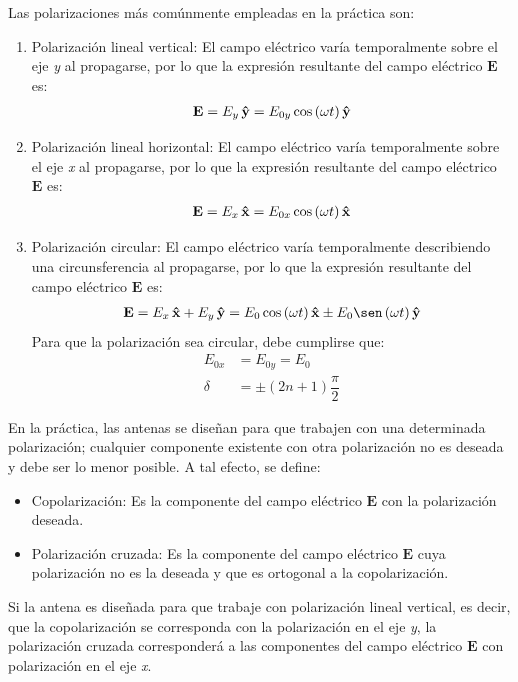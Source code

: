 Las polarizaciones más comúnmente empleadas en la práctica son:
\begin{enumerate}
\item Polarización lineal vertical: El campo eléctrico varía temporalmente sobre el eje \emph{y} al propagarse, por lo que la expresión resultante del campo eléctrico $\mathbf{E}$ es:
\begin{align}
\mathbf{E} = E_y\,\bm{\mathbf{\hat{y}}} =  E_{0y}\cos\left(\omega t\right)\bm{\mathbf{\hat{y}}}
\label{ec_intro:72}
\end{align}
\item Polarización lineal horizontal: El campo eléctrico varía temporalmente sobre el eje \emph{x} al propagarse, por lo que la expresión resultante del campo eléctrico $\mathbf{E}$ es:
\begin{align}
\mathbf{E} = E_x\,\bm{\mathbf{\hat{x}}} =  E_{0x}\cos\left(\omega t\right)\bm{\mathbf{\hat{x}}}
\label{ec_intro:73}
\end{align}
\item Polarización circular: El campo eléctrico varía temporalmente describiendo una circunsferencia al propagarse, por lo que la expresión resultante del campo eléctrico $\mathbf{E}$ es:
\begin{align}
\mathbf{E} = E_x\,\versor{x} + E_y\,\versor{y} =  E_{0}\cos\left(\omega t\right)\versor{x} \pm E_{0}\sen\left(\omega t\right)\versor{y}
\label{ec_intro:74}
\end{align}
Para que la polarización sea circular, debe cumplirse que:
\begin{align}
E_{0x} &= E_{0y} = E_0
\label{ec_intro:75}\\
\delta &= \pm\left(2n + 1\right)\dfrac{\pi}{2}
\label{ec_intro:76}
\end{align}
\end{enumerate}
En la práctica, las antenas se diseñan para que trabajen con una determinada polarización; cualquier componente existente con otra polarización no es deseada y debe ser lo menor posible. A tal efecto, se define:
\begin{itemize}
\item Copolarización: Es la componente del campo eléctrico $\mathbf{E}$ con la polarización deseada.
\item Polarización cruzada: Es la componente del campo eléctrico $\mathbf{E}$ cuya polarización no es la deseada y que es ortogonal a la copolarización.
\end{itemize}
Si la antena es diseñada para que trabaje con polarización lineal vertical, es decir, que la copolarización se corresponda con la polarización en el eje \emph{y}, la polarización cruzada corresponderá a las componentes del campo eléctrico $\mathbf{E}$ con polarización en el eje \emph{x}.

